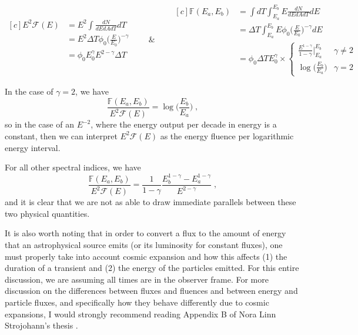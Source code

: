\documentclass[a4paper,11pt]{article}
\newcommand\ddfrac[2]{\frac{\displaystyle #1}{\displaystyle #2}}
\begin{document}
\begin{equation*}
\begin{aligned}[c]
    E^2\mathcal{F}(E) &= E^2\int \frac{dN}{dEdAdT} dT \\
    &= E^2 \Delta T \phi_0 \Big(\frac{E}{E_0}\Big)^{-\gamma} \\
    &= \phi_0 E_0^{\gamma} E^{2-\gamma}\Delta T
\end{aligned}
\qquad\&\qquad
\begin{aligned}[c]
    \mathbb{F}(E_a, E_b) &= \int dT \int_{E_a}^{E_b} E \frac{dN}{dEdAdT} dE \\ 
    &= \Delta T \int_{E_a}^{E_b} E \phi_0 \Big(\frac{E}{E_0}\Big)^{-\gamma} dE \\
    &= \phi_0 \Delta T E_0^{\gamma} \times \begin{cases}
            \ddfrac{E^{1-\gamma}}{1-\gamma}\Big|_{E_a}^{E_b} &\gamma\neq 2 \\ \log\big(\ddfrac{E_b}{E_a}\big) & \gamma = 2
        \end{cases}
\end{aligned}
\end{equation*}

In the case of $\gamma = 2$, we have 
\begin{equation}
    \frac{\mathbb{F}(E_a, E_b)}{E^2\mathcal{F}(E)} = \log\big(\ddfrac{E_b}{E_a}\big) \; ,
\end{equation}
so in the case of an $E^{-2}$, where the energy output per decade in energy is a constant, then we can interpret $E^2\mathcal{F}(E)$ as the energy fluence per logarithmic energy interval.

For all other spectral indices, we have
\begin{equation}
    \frac{\mathbb{F}(E_a, E_b)}{E^2\mathcal{F}(E)} = 
    \frac{1}{1-\gamma}\frac{E_b^{1-\gamma} - E_a^{1-\gamma}}{E^{2-\gamma}} \; ,
\end{equation}
and it is clear that we are not as able to draw immediate parallels between these two physical quantities.

It is also worth noting that in order to convert a flux to the amount of energy that an astrophysical source emits (or its luminosity for constant fluxes), one must properly take into account cosmic expansion and how this affects (1) the duration of a transient and (2) the energy of the particles emitted. For this entire discussion, we are assuming all times are in the observer frame. For more discussion on the differences between fluxes and fluences and between energy and particle fluxes, and specifically how they behave differently due to cosmic expansions, I would strongly recommend reading Appendix B of Nora Linn Strojohann's thesis \cite{norathesis}.
\end{document}
